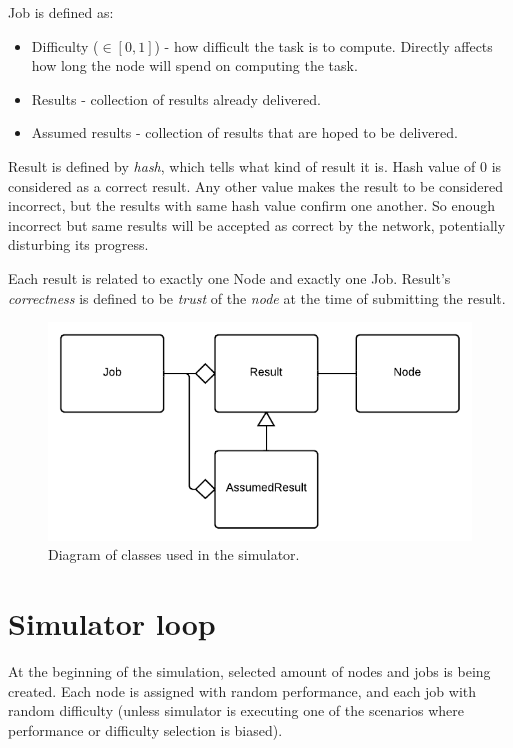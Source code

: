 Job is defined as:
\begin{itemize}
\item Difficulty ($\in [0,1]$) - how difficult the task is to compute. Directly affects how long the node will spend on computing the task.
\item Results - collection of results already delivered.
\item Assumed results - collection of results that are hoped to be delivered.
\end{itemize}

Result is defined by \emph{hash}, which tells what kind of result it is. Hash value of $0$ is considered as a correct result. Any other value makes the result to be considered incorrect, but the results with same hash value confirm one another. So enough incorrect but same results will be accepted as correct by the network, potentially disturbing its progress.

Each result is related to exactly one Node and exactly one Job. Result's \emph{correctness} is defined to be \emph{trust} of the \emph{node} at the time of submitting the result.

\begin{figure}
\centering
\includegraphics{diagrams/SimulatorClassDiagram.pdf}
\caption{Diagram of classes used in the simulator.}
\label{f:simclassdg}
\end{figure}

\section{Simulator loop}

At the beginning of the simulation, selected amount of nodes and jobs is being created. Each node is assigned with random performance, and each job with random difficulty (unless simulator is executing one of the scenarios where performance or difficulty selection is biased).

